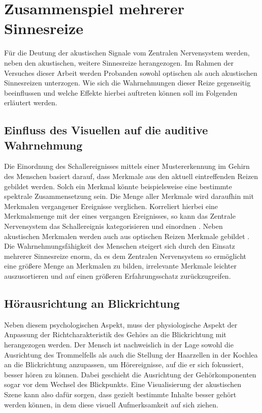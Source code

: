 \section{Zusammenspiel mehrerer Sinnesreize }
Für die Deutung der akustischen Signale vom Zentralen Nervensystem werden, neben den akustischen, weitere Sinnesreize herangezogen. Im Rahmen der Versuches dieser Arbeit werden Probanden sowohl optischen als auch akustischen Sinnesreizen unterzogen. Wie sich die Wahrnehmungen dieser Reize gegenseitig beeinflussen und welche Effekte hierbei auftreten können soll im Folgenden erläutert werden.

\subsection{Einfluss des Visuellen auf die auditive Wahrnehmung}
Die Einordnung des Schallereignisses mittels einer Mustererkennung im Gehirn des Menschen basiert darauf, dass Merkmale aus den aktuell eintreffenden Reizen gebildet werden. Solch ein Merkmal könnte beispielsweise eine bestimmte spektrale Zusammensetzung sein. Die Menge aller Merkmale wird daraufhin mit Merkmalen vergangener Ereignisse verglichen. Korreliert hierbei eine Merkmalsmenge mit der eines vergangen Ereignisses, so kann das Zentrale Nervensystem das Schallereignis kategorisieren und einordnen \cite[S.51]{HdA08}. Neben akustischen Merkmalen werden auch aus optischen Reizen Merkmale gebildet \cite[S.88]{HdA08}. Die Wahrnehmungsfähigkeit des Menschen steigert sich durch den Einsatz mehrerer Sinnesreize  enorm, da es  dem Zentralen Nervensystem so ermöglicht eine größere Menge an Merkmalen zu bilden, irrelevante Merkmale leichter auszusortieren und auf einen größeren Erfahrungsschatz  zurückzugreifen. \\ 

\subsection{Hörausrichtung an Blickrichtung}

Neben diesem psychologischen Aspekt, muss der physiologische Aspekt der Anpassung der Richtcharakteristik des Gehörs an die Blickrichtung mit herangezogen werden. Der Mensch ist nachweislich in der Lage sowohl die Ausrichtung des Trommelfells als auch die Stellung der Haarzellen in der Kochlea an die  Blickrichtung anzupassen, um Hörereignisse, auf die er sich fokussiert, besser hören zu können. Dabei geschieht die Ausrichtung der Gehörkomponenten sogar vor dem Wechsel des Blickpunkts\cite{Strick17}. Eine Visualisierung der akustischen Szene kann also dafür sorgen, dass gezielt bestimmte Inhalte besser gehört werden können, in dem diese visuell Aufmerksamkeit auf sich ziehen.  

